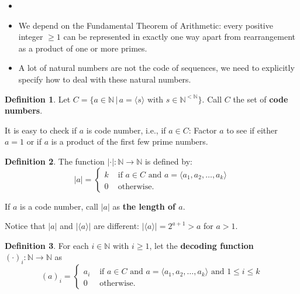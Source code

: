 \documentclass[11pt,letterpaper]{book}
\theoremstyle{definition}
\newtheorem{definition}{Definition}[section]
\begin{document}
\begin{itemize}
\item[]
\item{We depend on the Fundamental Theorem of Arithmetic: every positive integer $\geq 1$ can be represented in exactly one way apart from rearrangement as a product of one or more primes.}
\item{A lot of natural numbers are not the code of sequences, we need to explicitly specify how to deal with these natural numbers.}
\end{itemize}


\begin{definition}
Let $C = \{ a \in \mathbb{N}\, | \, a = \langle s \rangle \text{ with } s \in \mathbb{N}^{< \mathbb{N}} \}$. Call $C$ the set of \textbf{code numbers}.
\end{definition}


It is easy to check if $a$ is code number, i.e., if $a \in C$: Factor
$a$ to see if either $a=1$ or if $a$ is a product of the first few prime
numbers.


\begin{definition}
The function $ |  \cdot | : \mathbb{N} \rightarrow \mathbb{N}$ is
defined by:
\begin{equation}
|a| =
\begin{cases}
k & \text{ if } a \in C \text{ and } a = \langle a_1, a_2, \ldots, a_k \rangle \\
0 & \text{ otherwise.}
\end{cases}
    \nonumber
\end{equation}

If $a$ is a code number, call $|a|$ as \textbf{the length of $a$}.

\end{definition}


Notice that $|a|$ and $| \langle a \rangle |$ are different: $| \langle a \rangle | = 2^{a+1} > a$ for $a > 1$.



\begin{definition}
For each $i \in \mathbb{N}$ with $i\geq 1$, let the \textbf{decoding function} $(\cdot)_i
: \mathbb{N} \rightarrow \mathbb{N}$ as
\begin{equation}
(a)_i =
\begin{cases}
a_i & \text{ if } a \in C \text{ and } a = \langle a_1, a_2, \ldots, a_k \rangle
\text{ and } 1 \leq i \leq k \\
0 & \text{ otherwise}.
\end{cases}
\nonumber
\end{equation}
\end{definition}
\end{document}
